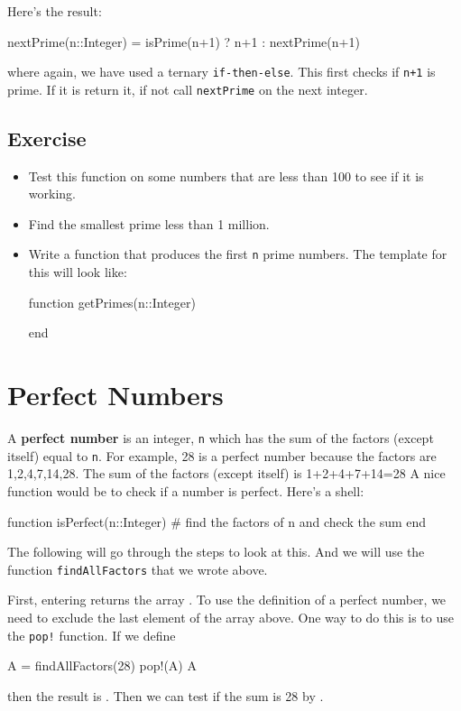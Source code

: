 Here's the result: 
\begin{jlblock}[nt]
nextPrime(n::Integer) = isPrime(n+1) ? n+1 : nextPrime(n+1)
\end{jlblock}
%
where again, we have used a ternary \texttt{if-then-else}.  This first checks if \texttt{n+1} is prime. If it is return it, if not call \texttt{nextPrime} on the next integer. 


\subsection{Exercise}

\begin{itemize}
\item Test this function on some numbers that are less than 100 to see if it is working. 
\item Find the smallest prime less than 1 million. 
\item  Write a function that produces the first \texttt{n} prime numbers.  The template for this will look like:
\begin{jlblock}[nt]
function getPrimes(n::Integer)
  
end
\end{jlblock}

\end{itemize}


\section{Perfect Numbers}

A \textbf{perfect number} is an integer, \texttt{n} which has the sum of
the factors (except itself) equal to \texttt{n}. For example, 28 is a
perfect number because the factors are 1,2,4,7,14,28. The sum of the
factors (except itself) is 1+2+4+7+14=28 A nice function would be to
check if a number is perfect. Here's a shell:

\begin{jlblock}[nt]
function isPerfect(n::Integer)
   # find the factors of n and check the sum
end
\end{jlblock}

The following will go through the steps to look at this.  And we will use the function \verb!findAllFactors! that we wrote above.  

First, entering  returns the array  \printpythontex[verb]. To use the definition of a perfect number, we need to exclude the last element of the array above.  One way to do this is to use the \verb|pop!| function.  If we define
\begin{jlblock}[nt]
A = findAllFactors(28)
pop!(A)
A
\end{jlblock}
then the result is \printpythontex.  Then we can test if the sum is 28 by .  

